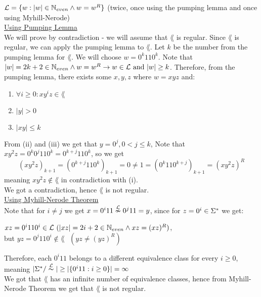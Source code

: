 $\mathcal{L}=\{w : |w| \in \mathbb{N}_{even} \wedge w = w^R\}$
(twice, once using the pumping lemma and once using Myhill-Nerode) \\

\underline{Using Pumping Lemma} \\

We will prove by contradiction - we will assume that $\lang$ is regular.
Since $\lang$ is regular, we can apply the pumping lemma to $\lang$. Let $k$
be the number from the pumping lemma for $\lang$. We will choose $w = 0^k 11 0^k $.
Note that $|w|=2k+2 \in \mathbb{N}_{even} \wedge w=w^R \rightarrow w \in \mathcal{L} \text{ and } |w| \geq k$.
Therefore, from the pumping lemma, there exists some $x, y, z$ where $w = xyz$ and:

\begin{enumerate}
    \item $\forall i \geq 0: x y^i z \in \lang$
    \item $|y| > 0$
    \item $|xy| \leq k$
\end{enumerate}

From (ii) and (iii) we get that $y=0^j, 0 < j \leq k$,
Note that $x y^2 z = 0^k 0^j 11 0^k = 0^{k+j} 11 0^k$,
so we get
\[
    (x y^2 z)_{k+1} = (0^{k+j} 11 0^k)_{k+1} = 0 \neq
    1 = (0^k 11 0^{k+j})_{k+1} = (x y^2 z)^R
\]
meaning $x y^2 z \notin \lang$ in contradiction with (i). \\
We got a contradiction, hence $\lang$ is not regular. \\


\underline{Using Myhill-Nerode Theorem} \\

Note that for $i \neq j$ we get $x = 0^i 11 \overset{\mathcal{L}}{\nsim} 0^j 11 = y$,
since for $z=0^i \in \Sigma^*$ we get:

$xz = 0^i 11 0^i \in \mathcal{L} \text{ } (|xz|=2i+2 \in \mathbb{N}_{even} \wedge xz=(xz)^R)$, \\
but $yz = 0^j 11 0^i \notin \lang \text{ } (yz \neq (yz)^R)$

Therefore, each $ 0^i 11 $ belongs to a different equivalence class for every $i \geq 0$, \\
meaning $|\Sigma^* / \overset{\mathcal{L}}{\thicksim}| \geq |\{0^i 11: i \geq 0\}| = \infty$ \\
We got that $\lang$ has an infinite number of equivalence classes, hence from
Myhill-Nerode Theorem we get that $\lang$ is not regular. \\